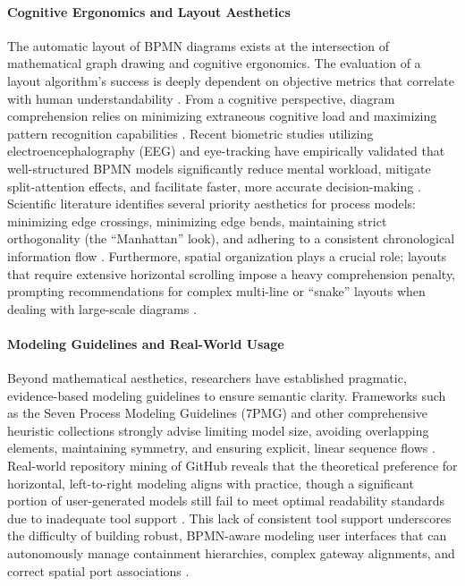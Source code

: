 \documentclass[fleqn,10pt]{wlscirep}
\begin{document}
\paragraph{Cognitive Ergonomics and Layout Aesthetics}
The automatic layout of BPMN diagrams exists at the intersection of mathematical graph drawing and cognitive ergonomics. The evaluation of a layout algorithm's success is deeply dependent on objective metrics that correlate with human understandability \cite{ref_purchase1997, ref_purchase2000}. From a cognitive perspective, diagram comprehension relies on minimizing extraneous cognitive load and maximizing pattern recognition capabilities \cite{ref_schrepfer}. Recent biometric studies utilizing electroencephalography (EEG) and eye-tracking have empirically validated that well-structured BPMN models significantly reduce mental workload, mitigate split-attention effects, and facilitate faster, more accurate decision-making \cite{ref_de_souza, ref_lubke_eye}. Scientific literature identifies several priority aesthetics for process models: minimizing edge crossings, minimizing edge bends, maintaining strict orthogonality (the ``Manhattan'' look), and adhering to a consistent chronological information flow \cite{ref_purchase1997, ref_corradini}. Furthermore, spatial organization plays a crucial role; layouts that require extensive horizontal scrolling impose a heavy comprehension penalty, prompting recommendations for complex multi-line or ``snake'' layouts when dealing with large-scale diagrams \cite{ref_lubke_eye}.

\paragraph{Modeling Guidelines and Real-World Usage}
Beyond mathematical aesthetics, researchers have established pragmatic, evidence-based modeling guidelines to ensure semantic clarity. Frameworks such as the Seven Process Modeling Guidelines (7PMG) and other comprehensive heuristic collections strongly advise limiting model size, avoiding overlapping elements, maintaining symmetry, and ensuring explicit, linear sequence flows \cite{ref_mendling, ref_corradini}. Real-world repository mining of GitHub reveals that the theoretical preference for horizontal, left-to-right modeling aligns with practice, though a significant portion of user-generated models still fail to meet optimal readability standards due to inadequate tool support \cite{ref_lubke_github, ref_baalmann_algo, ref_baalmann_val}. This lack of consistent tool support underscores the difficulty of building robust, BPMN-aware modeling user interfaces that can autonomously manage containment hierarchies, complex gateway alignments, and correct spatial port associations \cite{ref_jointjs, ref_effinger_patterns}.
\end{document}
